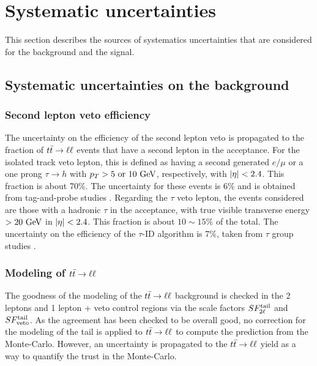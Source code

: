     \section{Systematic uncertainties \label{sec:analysis_systematics}}
        
        This section describes the sources of systematics uncertainties that are considered for the background and the signal.

        \subsection{Systematic uncertainties on the background \label{sec:background_systematics}}

            \subsubsection{Second lepton veto efficiency}

            The uncertainty on the efficiency of the second lepton veto is propagated to the
            fraction of $t\bar{t} \rightarrow \ell \ell$ events that have a second lepton in the acceptance. For
            the isolated track veto lepton, this is defined as having a second generated 
            $e/\mu$ or a one prong $\tau \rightarrow h$ with $p_T > 5 \text{ or } 10 ~\text{GeV}$, 
            respectively, with $\left| \eta \right| < 2.4$. This fraction is about 70\%. The uncertainty 
            for these events is 6\% and is obtained from tag-and-probe studies .
            Regarding the $\tau$ veto lepton, the events considered are those 
            with a hadronic $\tau$ in the acceptance, with true visible transverse energy $> 20 
            ~\text{GeV}$ in $\left| \eta \right| < 2.4$. This fraction is about $10 \sim 15 \%$ of the total. The 
            uncertainty on the efficiency of the $\tau$-ID algorithm is 7\%, taken from $\tau$ 
            group studies .

            \subsubsection{Modeling of $t\bar{t} \rightarrow \ell \ell$}

            The goodness of the modeling of the $t\bar{t} \rightarrow \ell \ell$ background is checked in the 2
            leptons and 1 lepton + veto control regions via the scale factors $SF_{2\ell}^{\text{tail}}$
            and $SF_{\text{veto}}^{\text{tail}}$. As the agreement has been checked to be overall good, no correction
            for the modeling of the tail is applied to $t\bar{t} \rightarrow \ell \ell$ to compute the prediction
            from the Monte-Carlo. However, an uncertainty is propagated to the $t\bar{t} \rightarrow \ell \ell$ yield 
            as a way to quantify the trust in the Monte-Carlo.

